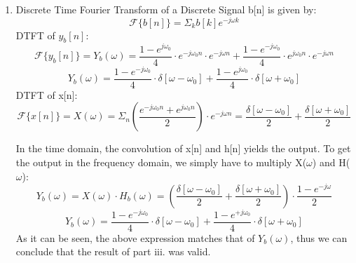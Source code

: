 \documentclass{article}
\begin{document}
\begin{enumerate}
\begin{enumerate}
\begin{enumerate}
 \item
                Discrete Time Fourier Transform of a Discrete Signal b[n] is given by:
                \[
                    \mathcal{F}\{b[n]\} = \Sigma_kb[k]e^{-j\omega k}
                \]
                DTFT of $y_b[n]$:
                \[
                    \mathcal{F}\{y_b[n]\} = Y_b(\omega) = \frac{1 - e^{j\omega_0}}{4} \cdot e^{-j\omega_0n}\cdot e^{-j\omega n} + \frac{1 - e^{-j\omega_0}}{4} \cdot e^{j\omega_0n}\cdot e^{-j\omega n}
                \]
                \[
                    Y_b(\omega) = \frac{1 - e^{-j\omega_0}}{4} \cdot \delta[\omega-\omega_0] + \frac{1 - e^{j\omega_0}}{4} \cdot \delta[\omega+\omega_0]
                \]
                DTFT of x[n]:
                \[
                    \mathcal{F}\{x[n]\} = X(\omega) = \Sigma_n\left(\frac{ e^{-j\omega_0 n} + e^{j\omega_0 n}}{2} \right)\cdot e^{-j\omega n} = \frac{\delta[\omega-\omega_0]}{2} + \frac{\delta[\omega+\omega_0]}{2}
                \]

                In the time domain, the convolution of x[n] and h[n] yields the output. To get the output in the frequency domain, we simply have to multiply X($\omega$) and H($\omega$):
                \[
                    Y_b(\omega) = X(\omega)\cdot H_b(\omega) = \left( \frac{\delta[\omega-\omega_0]}{2} + \frac{\delta[\omega+\omega_0]}{2} \right) \cdot \frac{1 - e^{-j\omega}}{2}
                \]
                \[
                    Y_b(\omega) = \frac{1 - e^{-j\omega_0}}{4} \cdot \delta[\omega-\omega_0] + \frac{1 - e^{+j\omega_0}}{4} \cdot \delta[\omega+\omega_0]
                \]
                As it can be seen, the above expression matches that of $Y_b(\omega)$, thus we can conclude that the result of part iii. was valid.


\end{enumerate}
\end{enumerate}
\end{enumerate}
\end{document}
